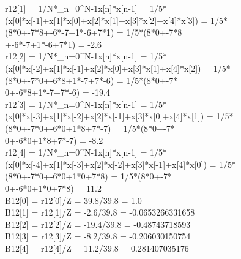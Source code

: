 \documentclass[landscape,12pt]{article}
\begin{document}
r12[1] = 1/N*\sum_{n=0}^{N-1}{x[n]*x[n-1]} = 1/5*(x[0]*x[-1]+x[1]*x[0]+x[2]*x[1]+x[3]*x[2]+x[4]*x[3]) = 1/5*(8*0+-7*8+-6*-7+1*-6+7*1) = 1/5*(8*0+-7*8\\
+-6*-7+1*-6+7*1) = -2.6\\

r12[2] = 1/N*\sum_{n=0}^{N-1}{x[n]*x[n-1]} = 1/5*(x[0]*x[-2]+x[1]*x[-1]+x[2]*x[0]+x[3]*x[1]+x[4]*x[2]) = 1/5*(8*0+-7*0+-6*8+1*-7+7*-6) = 1/5*(8*0+-7*\\
0+-6*8+1*-7+7*-6) = -19.4\\

r12[3] = 1/N*\sum_{n=0}^{N-1}{x[n]*x[n-1]} = 1/5*(x[0]*x[-3]+x[1]*x[-2]+x[2]*x[-1]+x[3]*x[0]+x[4]*x[1]) = 1/5*(8*0+-7*0+-6*0+1*8+7*-7) = 1/5*(8*0+-7*\\
0+-6*0+1*8+7*-7) = -8.2\\

r12[4] = 1/N*\sum_{n=0}^{N-1}{x[n]*x[n-1]} = 1/5*(x[0]*x[-4]+x[1]*x[-3]+x[2]*x[-2]+x[3]*x[-1]+x[4]*x[0]) = 1/5*(8*0+-7*0+-6*0+1*0+7*8) = 1/5*(8*0+-7*\\
0+-6*0+1*0+7*8) = 11.2\\

B12[0] = r12[0]/Z = 39.8/39.8 = 1.0\\
B12[1] = r12[1]/Z = -2.6/39.8 = -0.0653266331658\\
B12[2] = r12[2]/Z = -19.4/39.8 = -0.48743718593\\
B12[3] = r12[3]/Z = -8.2/39.8 = -0.206030150754\\
B12[4] = r12[4]/Z = 11.2/39.8 = 0.281407035176\\
\end{document}
